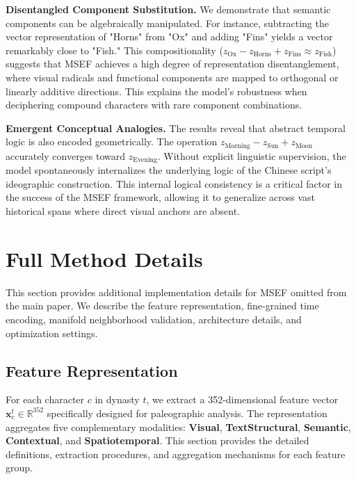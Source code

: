 \documentclass{article}
\begin{document}
\textbf{Disentangled Component Substitution.} 
We demonstrate that semantic components can be algebraically manipulated. For instance, subtracting the vector representation of "Horns" from "Ox" and adding "Fins" yields a vector remarkably close to "Fish." This compositionality ($z_{\text{Ox}} - z_{\text{Horns}} + z_{\text{Fins}} \approx z_{\text{Fish}}$) suggests that MSEF achieves a high degree of representation disentanglement, where visual radicals and functional components are mapped to orthogonal or linearly additive directions. This explains the model's robustness when deciphering compound characters with rare component combinations.

\textbf{Emergent Conceptual Analogies.} 
The results reveal that abstract temporal logic is also encoded geometrically. The operation $z_{\text{Morning}} - z_{\text{Sun}} + z_{\text{Moon}}$ accurately converges toward $z_{\text{Evening}}$. Without explicit linguistic supervision, the model spontaneously internalizes the underlying logic of the Chinese script's ideographic construction. This internal logical consistency is a critical factor in the success of the MSEF framework, allowing it to generalize across vast historical spans where direct visual anchors are absent.









\section{Full Method Details}
\label{app:method_details}

This section provides additional implementation details for MSEF omitted from the main paper. 
We describe the feature representation, fine-grained time encoding, manifold neighborhood validation, architecture details, and optimization settings.

\subsection{Feature Representation}
\label{app:features_summary}

For each character $c$ in dynasty $t$, we extract a 352-dimensional feature vector $\mathbf{x}_c^t \in \mathbb{R}^{352}$ specifically designed for paleographic analysis. 
The representation aggregates five complementary modalities: \textbf{Visual}, \textbf{TextStructural}, \textbf{Semantic}, \textbf{Contextual}, and \textbf{Spatiotemporal}. 
This section provides the detailed definitions, extraction procedures, and aggregation mechanisms for each feature group.
\end{document}
